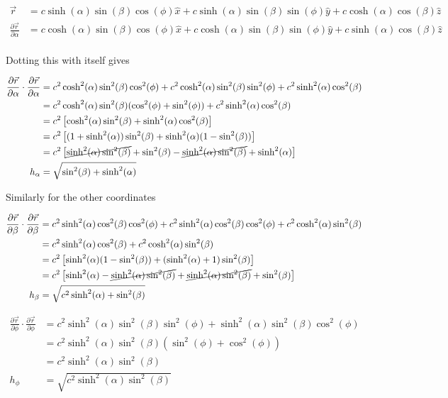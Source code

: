 \documentclass[paper=a4, fontsize=11pt]{scrartcl} %
\newcommand{\partd}[2]{\frac{\partial #1}{\partial #2}}
\numberwithin{equation}{section} %
\numberwithin{figure}{section} %
\numberwithin{table}{section} %
\begin{document}
\begin{align}
\vec{r} &= c\sinh(\alpha)\sin(\beta)\cos(\phi)\hat{x} + c\sinh(\alpha)\sin(\beta)\sin(\phi)\hat{y} + c\cosh(\alpha)\cos(\beta)\hat{z} \\
\partd{\vec{r}}{\alpha} &= c\cosh(\alpha)\sin(\beta)\cos(\phi)\hat{x} + c\cosh(\alpha)\sin(\beta)\sin(\phi)\hat{y} + c\sinh(\alpha)\cos(\beta)\hat{z}\\
\end{align}

Dotting this with itself gives

\begin{align}
\partd{\vec{r}}{\alpha} \cdot \partd{\vec{r}}{\alpha} &= c^2 \cosh^2(\alpha)\sin^2(\beta)\cos^2(\phi) + c^2 \cosh^2(\alpha)\sin^2(\beta)\sin^2(\phi) + c^2 \sinh^2(\alpha)\cos^2(\beta) \\
&= c^2\cosh^2(\alpha)\sin^2(\beta)(\cos^2(\phi) + \sin^2(\phi)) + c^2 \sinh^2(\alpha)\cos^2(\beta) \\
&= c^2\left[\cosh^2(\alpha)\sin^2(\beta) + \sinh^2(\alpha)\cos^2(\beta)\right] \\
&= c^2\left[(1 + \sinh^2(\alpha))\sin^2(\beta) + \sinh^2(\alpha)(1 - \sin^2(\beta))\right] \\
&= c^2\left[\cancel{\sinh^2(\alpha)\sin^2(\beta)} + \sin^2(\beta) - \cancel{\sinh^2(\alpha)\sin^2(\beta)} + \sinh^2(\alpha)\right]\\
h_{\alpha} &= \sqrt{\sin^2(\beta) + \sinh^2(\alpha)} 
\end{align}

Similarly for the other coordinates

\begin{align}
\partd{\vec{r}}{\beta}\cdot \partd{\vec{r}}{\beta}&= c^2\sinh^2(\alpha)\cos^2(\beta)\cos^2(\phi) + c^2\sinh^2(\alpha)\cos^2(\beta)\cos^2(\phi) + c^2 \cosh^2(\alpha)\sin^2(\beta) \\ 
&= c^2\sinh^2(\alpha)\cos^2(\beta) + c^2 \cosh^2(\alpha)\sin^2(\beta) \\
&= c^2\left[\sinh^2(\alpha)(1-\sin^2(\beta)) + (\sinh^2(\alpha) + 1)\sin^2(\beta)\right]\\
&= c^2\left[\sinh^2(\alpha) - \cancel{\sinh^2(\alpha)\sin^2(\beta)} + \cancel{\sinh^2(\alpha)\sin^2(\beta)} + \sin^2(\beta)\right] \\
h_{\beta} &= \sqrt{c^2\sinh^2(\alpha) +\sin^2(\beta)} 
\end{align}

\begin{align}
\partd{\vec{r}}{\phi} \cdot \partd{\vec{r}}{\phi} &= c^2\sinh^2(\alpha)\sin^2(\beta)\sin^2(\phi) + \sinh^2(\alpha)\sin^2(\beta)\cos^2(\phi) \\
&= c^2\sinh^2(\alpha)\sin^2(\beta)(\sin^2(\phi) + \cos^2(\phi)) \\
&= c^2\sinh^2(\alpha)\sin^2(\beta) \\
h_{\phi} &= \sqrt{c^2\sinh^2(\alpha)\sin^2(\beta)}
\end{align}
\end{document}
